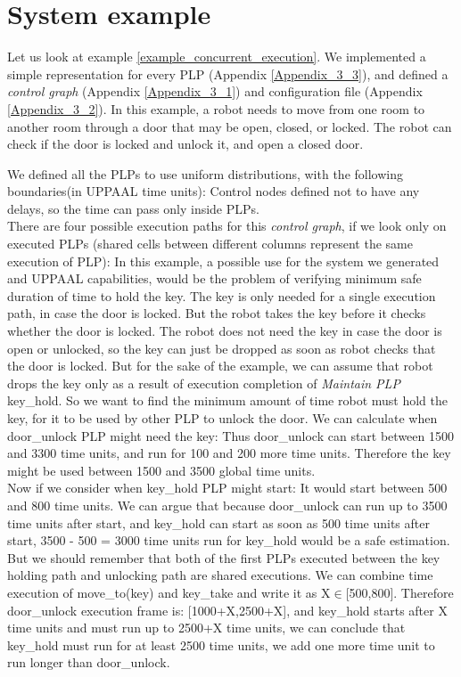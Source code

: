 \section{System example}
Let us look at example \ref{example_concurrent_execution}. We implemented a simple representation for every PLP (Appendix \ref{Appendix_3_3}), and defined a \textit{control graph} (Appendix \ref{Appendix_3_1}) and configuration file (Appendix \ref{Appendix_3_2}). In this example, a robot needs to move from one room to another room through a door that may be open, closed, or locked. The robot can check if the door is locked and unlock it, and open a closed door.
\par We defined all the PLPs to use uniform distributions, with the following boundaries(in UPPAAL time units):  \runTimesPLPsTable  \newline
Control nodes defined not to have any delays, so the time can pass only inside PLPs.\\
There are four possible execution paths for this \textit{control graph}, if we look only on executed PLPs (shared cells between different columns represent the same execution of PLP): \plpsExecutionTable \newline
In this example, a possible use for the system we generated and UPPAAL capabilities, would be the problem of verifying minimum safe duration of time to hold the key. The key is only needed for a single execution path, in case the door is locked. But the robot takes the key before it checks whether the door is locked. The robot does not need the key in case the door is open or unlocked, so the key can just be dropped as soon as robot checks that the door is locked. But for the sake of the example, we can assume that robot drops the key only as a result of execution completion of \textit{Maintain PLP} key_hold. So we want to find the minimum amount of time robot must hold the key, for it to be used by other PLP to unlock the door. We can calculate when door_unlock PLP might need the key: \runTimesPTAsTableAll \newline
Thus door_unlock can start between 1500 and 3300 time units, and run for 100 and 200 more time units. Therefore the key might be used between 1500 and 3500 global time units.\\
Now if we consider when key_hold PLP might start:\runTimesPTAsTableStart \newline
It would start between 500 and 800 time units. We can argue that because door_unlock can run up to 3500 time units after start, and key_hold can start as soon as 500 time units after start, 3500 - 500 = 3000 time units run for key_hold would be a safe estimation. But we should remember that both of the first PLPs executed between the key holding path and unlocking path are shared executions. We can combine time execution of move_to(key) and key_take and write it as X$\in$[500,800]. Therefore door_unlock execution frame is: [1000+X,2500+X], and key_hold starts after X time units and must run up to 2500+X time units, we can conclude that key_hold must run for at least 2500 time units, we add one more time unit to run longer than door_unlock.\\
